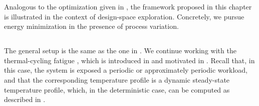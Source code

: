 Analogous to the optimization given in , the framework
proposed in this chapter is illustrated in the context of design-space
exploration. Concretely, we pursue energy minimization in the presence of
process variation.

\subsection{\problemtitle}

The general setup is the same as the one in .
We continue working with the thermal-cycling fatigue \cite{jedec2016}, which is
introduced in  and motivated in
. Recall that, in this case, the system is exposed a
periodic or approximately periodic workload, and that the corresponding
temperature profile is a dynamic steady-state temperature profile, which, in the
deterministic case, can be computed as described in
.

